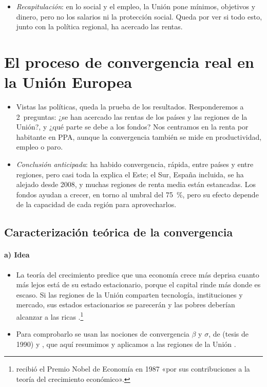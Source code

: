 \documentclass[11pt]{article}
\begin{document}
\begin{itemize}
\item \emph{Recapitulación}: en lo social y el empleo, la Unión pone mínimos, objetivos y dinero, pero no los salarios ni la protección social. Queda por ver si todo esto, junto con la política regional, ha acercado las rentas.
\end{itemize}

\section{El proceso de convergencia real en la Unión Europea}\label{sec:convergencia}

\begin{itemize}
\item Vistas las políticas, queda la prueba de los resultados. Responderemos a 2~preguntas: ¿se han acercado las rentas de los países y las regiones de la Unión?, y ¿qué parte se debe a los fondos? Nos centramos en la renta por habitante en PPA, aunque la convergencia también se mide en productividad, empleo o paro.
\item \emph{Conclusión anticipada}: ha habido convergencia, rápida, entre países y entre regiones, pero casi toda la explica el Este; el Sur, España incluida, se ha alejado desde 2008, y muchas regiones de renta media están estancadas. Los fondos ayudan a crecer, en torno al umbral del 75~\%, pero su efecto depende de la capacidad de cada región para aprovecharlos.
\end{itemize}

\subsection{Caracterización teórica de la convergencia}\label{sec:caracterizacion}

\paragraph{a) Idea}

\begin{itemize}
\item La teoría del crecimiento predice que una economía crece más deprisa cuanto más lejos está de su estado estacionario, porque el capital rinde más donde es escaso. Si las regiones de la Unión comparten tecnología, instituciones y mercado, sus estados estacionarios se parecerán y las pobres deberían alcanzar a las ricas .\footnote{ recibió el Premio Nobel de Economía en 1987 «por sus contribuciones a la teoría del crecimiento económico»\nocite{Nobel1987Solow}.}
\item Para comprobarlo se usan las nociones de convergencia $\beta$ y $\sigma$, de  (tesis de 1990) y \textcite{BarroSalaiMartin1991}, que aquí resumimos y aplicamos a las regiones de la Unión .
\end{itemize}
\end{document}
